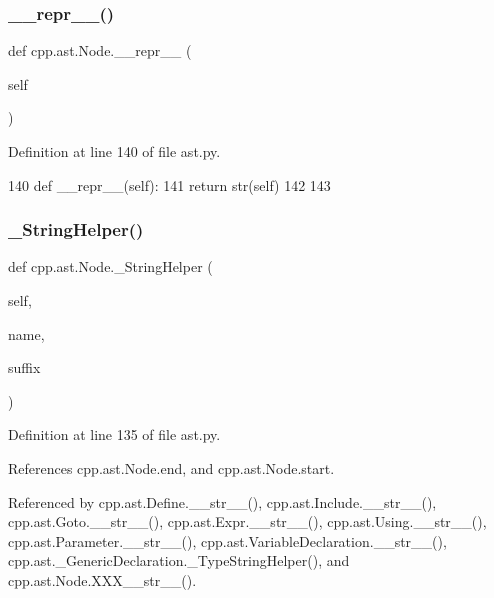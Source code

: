 \subsubsection{\texorpdfstring{\+\_\+\+\_\+repr\+\_\+\+\_\+()}{\_\_repr\_\_()}}
{\footnotesize\ttfamily def cpp.\+ast.\+Node.\+\_\+\+\_\+repr\+\_\+\+\_\+ (\begin{DoxyParamCaption}\item[{}]{self }\end{DoxyParamCaption})}



Definition at line 140 of file ast.\+py.


\begin{DoxyCode}
140     \textcolor{keyword}{def }\_\_repr\_\_(self):
141         \textcolor{keywordflow}{return} str(self)
142 
143 
\end{DoxyCode}
\mbox{\label{classcpp_1_1ast_1_1Node_acb9507fa368fa5d6045a9eb9a0a8c3d3}} 
\subsubsection{\texorpdfstring{\+\_\+\+String\+Helper()}{\_StringHelper()}}
{\footnotesize\ttfamily def cpp.\+ast.\+Node.\+\_\+\+String\+Helper (\begin{DoxyParamCaption}\item[{}]{self,  }\item[{}]{name,  }\item[{}]{suffix }\end{DoxyParamCaption})\hspace{0.3cm}{\ttfamily [private]}}



Definition at line 135 of file ast.\+py.



References cpp.\+ast.\+Node.\+end, and cpp.\+ast.\+Node.\+start.



Referenced by cpp.\+ast.\+Define.\+\_\+\+\_\+str\+\_\+\+\_\+(), cpp.\+ast.\+Include.\+\_\+\+\_\+str\+\_\+\+\_\+(), cpp.\+ast.\+Goto.\+\_\+\+\_\+str\+\_\+\+\_\+(), cpp.\+ast.\+Expr.\+\_\+\+\_\+str\+\_\+\+\_\+(), cpp.\+ast.\+Using.\+\_\+\+\_\+str\+\_\+\+\_\+(), cpp.\+ast.\+Parameter.\+\_\+\+\_\+str\+\_\+\+\_\+(), cpp.\+ast.\+Variable\+Declaration.\+\_\+\+\_\+str\+\_\+\+\_\+(), cpp.\+ast.\+\_\+\+Generic\+Declaration.\+\_\+\+Type\+String\+Helper(), and cpp.\+ast.\+Node.\+X\+X\+X\+\_\+\+\_\+str\+\_\+\+\_\+().


